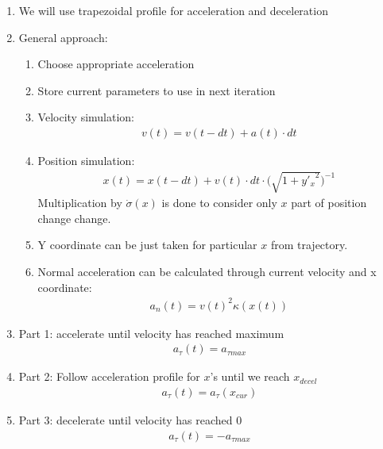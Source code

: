 \documentclass{article}
\begin{document}
\begin{enumerate}
            \begin{enumerate}
                  \item We will use trapezoidal profile for acceleration and deceleration
                  \item General approach:
                        \begin{enumerate}
                              \item Choose appropriate acceleration
                              \item Store current parameters to use in next iteration
                              \item Velocity simulation:
                                    \begin{align}
                                          v(t) = v(t - dt) + a(t) \cdot dt
                                    \end{align}
                              \item Position simulation:
                                    \begin{align}
                                          x(t) = x(t - dt) + v(t) \cdot dt \cdot \Big( \sqrt{1 + {y'_{x}}^2}\Big)^{-1}
                                    \end{align}
                                    Multiplication by $\dot{\sigma} (x)$ is done to consider only $x$ part of position change change.
                              \item Y coordinate can be just taken for particular $x$ from trajectory.
                              \item Normal acceleration can be calculated through current velocity and x coordinate:
                                    \begin{align}
                                          a_n(t) = v(t)^2 \kappa(x(t))
                                    \end{align}
                        \end{enumerate}
                  \item Part 1: accelerate until velocity has reached maximum
                        \begin{align}
                              a_{\tau}(t) = a_{\tau max}
                        \end{align}
                  \item Part 2: Follow acceleration profile for $x$'s until we reach $x_{decel}$
                        \begin{align}
                              a_{\tau}(t) = a_{\tau}(x_{cur})
                        \end{align}
                  \item Part 3: decelerate until velocity has reached 0
                        \begin{align}
                              a_{\tau}(t) = -a_{\tau max}
                        \end{align}
            \end{enumerate}
\end{enumerate}
\end{document}
